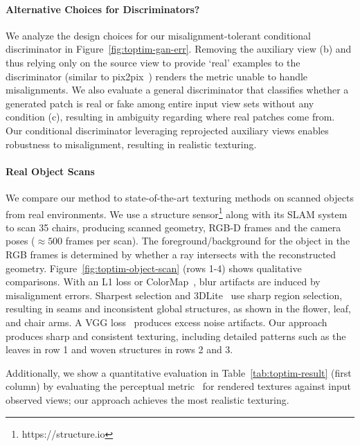 \paragraph*{Alternative Choices for Discriminators?} 
We analyze the design choices for our misalignment-tolerant conditional discriminator in Figure~\ref{fig:toptim-gan-err}.
Removing the auxiliary view (b) and thus relying only on the source view to provide `real' examples to the discriminator (similar to pix2pix~\cite{isola2017image}) renders the metric unable to handle misalignments.
We also evaluate a  general discriminator that classifies whether a generated patch is real or fake among entire input view sets without any condition (c), resulting in ambiguity regarding where real patches come from. 
Our conditional discriminator leveraging reprojected auxiliary views enables robustness to misalignment, resulting in realistic texturing.

\paragraph*{Real Object Scans}
We compare our method to state-of-the-art texturing methods on scanned objects from real environments. We use a structure sensor\footnote{https://structure.io} along with its SLAM system to scan 35 chairs, producing scanned geometry, RGB-D frames and the camera poses ($\approx 500$ frames per scan). 
The foreground/background for the object in the RGB frames is determined by whether a ray intersects with the reconstructed geometry. Figure~\ref{fig:toptim-object-scan} (rows 1-4) shows qualitative comparisons.
With an L1 loss or ColorMap~\cite{zhou2014color}, blur artifacts are induced by misalignment errors.
Sharpest selection and 3DLite~\cite{huang20173dlite} use sharp region selection, resulting in seams and inconsistent global structures, as shown in the flower, leaf, and chair arms. 
A VGG loss~\cite{johnson2016perceptual} produces excess noise artifacts.  
Our approach produces sharp and consistent texturing, including detailed patterns such as the leaves in row 1 and woven structures in rows 2 and 3.

Additionally, we show a quantitative evaluation in Table~\ref{tab:toptim-result} (first column) by evaluating the perceptual metric~\cite{zhang2018unreasonable} for rendered textures against input observed views; our approach achieves the most realistic texturing.

